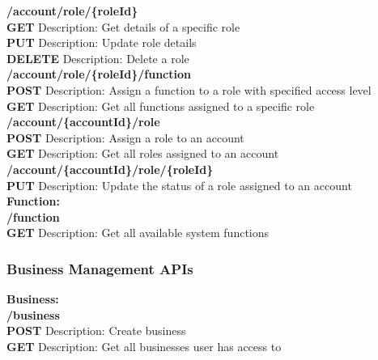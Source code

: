 \documentclass[11pt,a4paper,pdftex]{article}
\begin{document}
\hspace*{1em}\textbf{/account/role/\{roleId\}}\\
\hspace*{2em}\textbf{GET} Description: Get details of a specific role\\
\hspace*{2em}\textbf{PUT} Description: Update role details\\
\hspace*{2em}\textbf{DELETE} Description: Delete a role\\

\hspace*{1em}\textbf{/account/role/\{roleId\}/function}\\
\hspace*{2em}\textbf{POST} Description: Assign a function to a role with specified access level\\
\hspace*{2em}\textbf{GET} Description: Get all functions assigned to a specific role\\

\hspace*{1em}\textbf{/account/\{accountId\}/role}\\
\hspace*{2em}\textbf{POST} Description: Assign a role to an account\\
\hspace*{2em}\textbf{GET} Description: Get all roles assigned to an account\\

\hspace*{1em}\textbf{/account/\{accountId\}/role/\{roleId\}}\\
\hspace*{2em}\textbf{PUT} Description: Update the status of a role assigned to an account\\


\textbf{Function:}\\
\hspace*{1em}\textbf{/function}\\
\hspace*{2em}\textbf{GET} Description: Get all available system functions\\


\subsubsection{Business Management APIs}
\textbf{Business:}\\
\hspace*{1em}\textbf{/business}\\
\hspace*{2em}\textbf{POST} Description: Create business\\
\hspace*{2em}\textbf{GET} Description: Get all businesses user has access to\\
\end{document}
